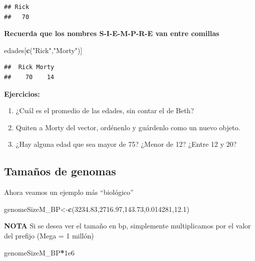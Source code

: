 \documentclass[
]{book}
\newenvironment{Shaded}{\begin{snugshade}}{\end{snugshade}}
\newcommand{\FloatTok}[1]{\textcolor[rgb]{0.00,0.00,0.81}{#1}}
\newcommand{\FunctionTok}[1]{\textcolor[rgb]{0.13,0.29,0.53}{\textbf{#1}}}
\newcommand{\NormalTok}[1]{#1}
\newcommand{\OtherTok}[1]{\textcolor[rgb]{0.56,0.35,0.01}{#1}}
\newcommand{\SpecialCharTok}[1]{\textcolor[rgb]{0.81,0.36,0.00}{\textbf{#1}}}
\newcommand{\StringTok}[1]{\textcolor[rgb]{0.31,0.60,0.02}{#1}}
\providecommand{\tightlist}{%
  \setlength{\itemsep}{0pt}\setlength{\parskip}{0pt}}
\begin{document}
\begin{verbatim}
## Rick 
##   70
\end{verbatim}

\textbf{Recuerda que los nombres S-I-E-M-P-R-E van entre comillas}

\begin{Shaded}
\begin{Highlighting}[]
\NormalTok{edades[}\FunctionTok{c}\NormalTok{(}\StringTok{"Rick"}\NormalTok{,}\StringTok{"Morty"}\NormalTok{)]}
\end{Highlighting}
\end{Shaded}

\begin{verbatim}
##  Rick Morty 
##    70    14
\end{verbatim}

\textbf{Ejercicios:}

\begin{enumerate}
\def\labelenumi{\arabic{enumi}.}
\tightlist
\item
  ¿Cuál es el promedio de las edades, sin contar el de Beth?
\item
  Quiten a Morty del vector, ordénenlo y guárdenlo como un nuevo objeto.
\item
  ¿Hay alguna edad que sea mayor de 75? ¿Menor de 12? ¿Entre 12 y 20?
\end{enumerate}

\subsection{Tamaños de genomas}\label{tamauxf1os-de-genomas}

Ahora veamos un ejemplo más ``biológico''

\begin{Shaded}
\begin{Highlighting}[]
\NormalTok{genomeSizeM\_BP}\OtherTok{\textless{}{-}}\FunctionTok{c}\NormalTok{(}\FloatTok{3234.83}\NormalTok{,}\FloatTok{2716.97}\NormalTok{,}\FloatTok{143.73}\NormalTok{,}\FloatTok{0.014281}\NormalTok{,}\FloatTok{12.1}\NormalTok{)}
\end{Highlighting}
\end{Shaded}

\textbf{NOTA} Si se desea ver el tamaño en bp, simplemente multiplicamos por el valor del prefijo (Mega = 1 millón)

\begin{Shaded}
\begin{Highlighting}[]
\NormalTok{genomeSizeM\_BP}\SpecialCharTok{*}\FloatTok{1e6}
\end{Highlighting}
\end{Shaded}
\end{document}
